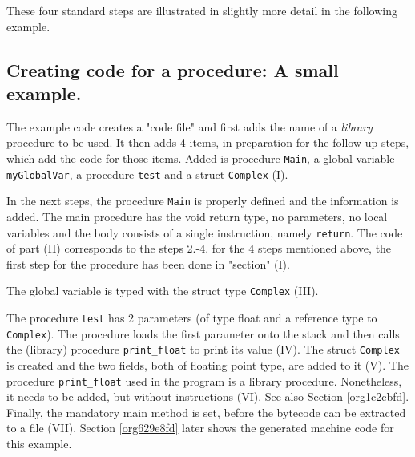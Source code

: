 \documentclass[11pt]{article}
\begin{document}
These four standard steps are illustrated in slightly more detail in the
following example.

\subsection{Creating code for a procedure: A small example.}
\label{sec:org25e9633}

The example code creates a "code file" and first adds the name of a
\emph{library} procedure to be used.  It then adds 4 items, in preparation for
the follow-up steps, which add the code for those items. Added is procedure
\texttt{Main}, a global variable \texttt{myGlobalVar}, a procedure \texttt{test} and a struct
\texttt{Complex} (I).


In the next steps, the procedure \texttt{Main} is properly defined and the
information is added. The main procedure has the void return type, no
parameters, no local variables and the body consists of a single
instruction, namely \texttt{return}. The code of part (II) corresponds to the
steps 2.-4. for the 4 steps mentioned above, the first step for the
procedure has been done in "section" (I).

The global variable is typed with the struct type \texttt{Complex} (III).

The procedure \texttt{test} has 2 parameters (of type float and a reference type
to \texttt{Complex}). The procedure loads the first parameter onto the stack and
then calls the (library) procedure \texttt{print\_float} to print its value
(IV). The struct \texttt{Complex} is created and the two fields, both of floating
point type, are added to it (V). The procedure \texttt{print\_float} used in the
program is a library procedure. Nonetheless, it needs to be added, but
without instructions (VI). See also Section
\ref{org1c2cbfd}. Finally, the mandatory main method is set,
before the bytecode can be extracted to a file (VII). Section
\ref{org629e8fd} later shows the generated machine code for
this example.
\end{document}
